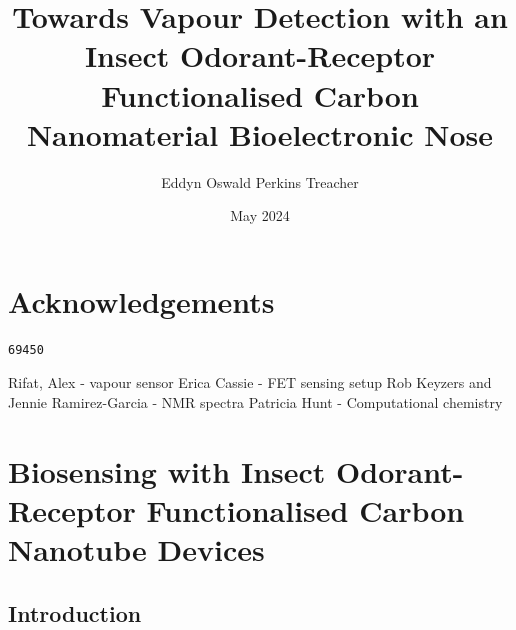 \documentclass[
  a4paper,
]{scrbook}
\title{Towards Vapour Detection with an Insect Odorant-Receptor
Functionalised Carbon Nanomaterial Bioelectronic Nose}
\author{Eddyn Oswald Perkins Treacher}
\date{May 2024}
\renewcommand*\contentsname{Table of contents}
\newcommand\contentsname{Table of contents}
\begin{document}
\frontmatter
\maketitle
\ifdefined\Shaded\renewenvironment{Shaded}{\begin{tcolorbox}[interior hidden, boxrule=0pt, frame hidden, breakable, borderline west={3pt}{0pt}{shadecolor}, sharp corners, enhanced]}{\end{tcolorbox}}\fi

\renewcommand*\contentsname{Table of contents}
{
\setcounter{tocdepth}{2}
\tableofcontents
}
\mainmatter
{}

\hypertarget{acknowledgements}{%
\chapter*{Acknowledgements}\label{acknowledgements}}


\begin{verbatim}
69450
\end{verbatim}

Rifat, Alex - vapour sensor Erica Cassie - FET sensing setup Rob Keyzers
and Jennie Ramirez-Garcia - NMR spectra Patricia Hunt - Computational
chemistry


\hypertarget{biosensing-with-insect-odorant-receptor-functionalised-carbon-nanotube-devices}{%
\chapter{Biosensing with Insect Odorant-Receptor Functionalised Carbon
Nanotube
Devices}\label{biosensing-with-insect-odorant-receptor-functionalised-carbon-nanotube-devices}}

\hypertarget{introduction}{%
\section{Introduction}\label{introduction}}
\end{document}
